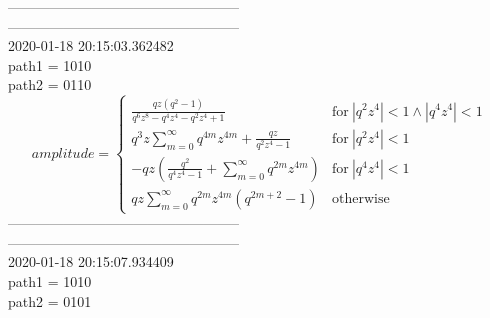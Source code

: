 --------------------------------------------------\\
--------------------------------------------------\\
2020-01-18 20:15:03.362482\\
path1 = 1010\\
path2 = 0110\\
$$amplitude = \begin{cases} \frac{q z \left(q^{2} - 1\right)}{q^{6} z^{8} - q^{4} z^{4} - q^{2} z^{4} + 1} & \text{for}\: \left|{q^{2} z^{4}}\right| < 1 \wedge \left|{q^{4} z^{4}}\right| < 1 \\q^{3} z \sum_{m=0}^{\infty} q^{4 m} z^{4 m} + \frac{q z}{q^{2} z^{4} - 1} & \text{for}\: \left|{q^{2} z^{4}}\right| < 1 \\- q z \left(\frac{q^{2}}{q^{4} z^{4} - 1} + \sum_{m=0}^{\infty} q^{2 m} z^{4 m}\right) & \text{for}\: \left|{q^{4} z^{4}}\right| < 1 \\q z \sum_{m=0}^{\infty} q^{2 m} z^{4 m} \left(q^{2 m + 2} - 1\right) & \text{otherwise} \end{cases}$$
--------------------------------------------------\\
--------------------------------------------------\\
2020-01-18 20:15:07.934409\\
path1 = 1010\\
path2 = 0101\\
